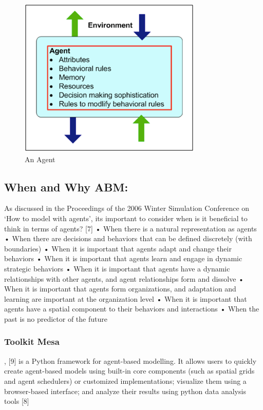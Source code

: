 \documentclass[]{article}
\begin{document}
\begin{figure}
    \centering
    \includegraphics{uploads/upload_294517dbfba011eb51dca1094d201cea.png}
    \caption{An Agent \citep{macal2010tutorial}}
    \label{fig:agent}
\end{figure}

\subsection{When and Why ABM:}\label{when-and-why-abm}

As discussed in the Proceedings of the 2006 Winter Simulation Conference
on `How to model with agents', its important to consider when is it
beneficial to think in terms of agents? {[}7{]} • When there is a
natural representation as agents • When there are decisions and
behaviors that can be defined discretely (with boundaries) • When it is
important that agents adapt and change their behaviors • When it is
important that agents learn and engage in dynamic strategic behaviors •
When it is important that agents have a dynamic relationships with other
agents, and agent relationships form and dissolve • When it is important
that agents form organizations, and adaptation and learning are
important at the organization level • When it is important that agents
have a spatial component to their behaviors and interactions • When the
past is no predictor of the future 

\subsubsection{Toolkit Mesa},
{[}9{]} is a Python framework for agent-based modelling. It allows users
to quickly create agent-based models using built-in core components
(such as spatial grids and agent schedulers) or customized
implementations; visualize them using a browser-based interface; and
analyze their results using python data analysis tools {[}8{]} 
\end{document}
